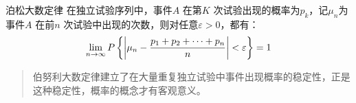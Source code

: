 \begin{theorem}{泊松大数定律}
    在独立试验序列中，事件\(A\) 在第\(K\) 次试验出现的概率为\(p_{k}\)，记\(\mu_{n}\)为事件\(A\)
    在前\(n\) 次试验中出现的次数，则对任意\(\varepsilon>0\)，都有：
    \[
        \lim_{n \to \infty} P\left\{\left|\mu_{n} - \frac{p_{1}+p_{2}+\dots
        +p_{n}}{n}\right| < \varepsilon\right\} = 1
    \]
\end{theorem}

\begin{quote}
    伯努利大数定律建立了在大量重复独立试验中事件出现概率的稳定性，正是这种稳定性，概率的概念才有客观意义。
\end{quote}

